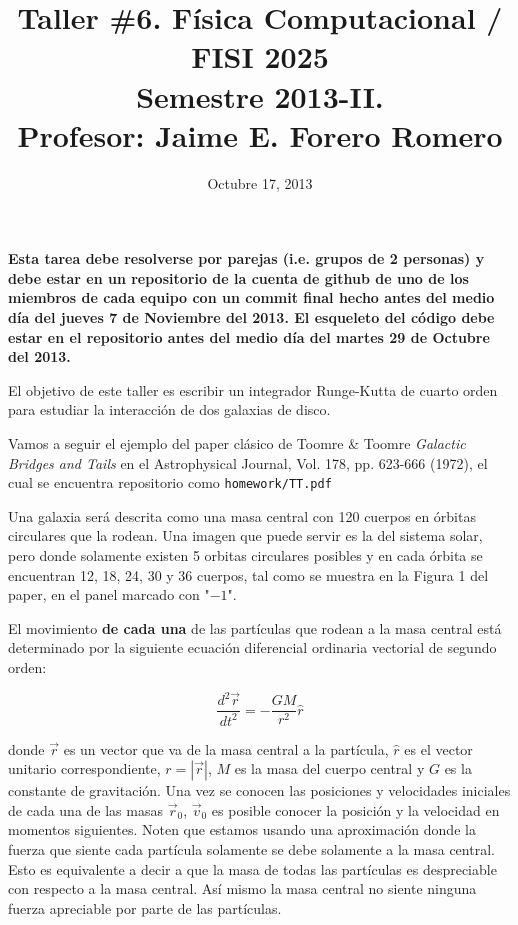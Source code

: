\documentclass{article}
\title{Taller \#6. F\'isica Computacional / FISI 2025 \\Semestre
  2013-II. \\ Profesor: Jaime E. Forero Romero}
\date{Octubre 17, 2013}
\begin{document}
\maketitle

{\bf Esta tarea debe resolverse por parejas (i.e. grupos de 2
  personas) y debe estar en un repositorio de la cuenta de github de
  uno de los miembros de cada equipo con un commit final hecho antes del
  medio d\'ia del jueves 7 de Noviembre del 2013. El esqueleto del
  c\'odigo debe estar en el repositorio antes del medio d\'ia del
  martes 29 de Octubre del 2013.}   


El objetivo de este taller es escribir un integrador Runge-Kutta de
cuarto orden para estudiar la interacci\'on de dos galaxias de
disco. 

Vamos a seguir el ejemplo  del paper cl\'asico de Toomre \& Toomre
\textit{Galactic Bridges and Tails} en el Astrophysical Journal, Vol. 178,
pp. 623-666 (1972), el cual se encuentra repositorio como
\verb"homework/TT.pdf" 

Una galaxia ser\'a descrita como una masa central con 120
cuerpos en \'orbitas circulares que la rodean. Una imagen que puede
servir es la del sistema solar, pero donde solamente existen 5 orbitas
circulares posibles y en cada \'orbita se encuentran 12, 18, 24, 30 y 36
cuerpos, tal como se muestra en la Figura 1 del paper, en el panel
marcado con "$-1$". 

El movimiento {\bf de cada una} de las part\'iculas que rodean a la masa
central est\'a determinado por la siguiente ecuaci\'on diferencial
ordinaria vectorial de segundo orden: 
 
\begin{equation}
\frac{d^2\vec{r}}{dt^2} = -\frac{GM}{r^2} \hat{r}
\end{equation}

donde $\vec{r}$  es un vector que va de la masa central a la
part\'icula, $\hat{r}$ es el vector unitario correspondiente,
$r=|\vec{r}|$, $M$ es la masa del cuerpo central y $G$ es la constante
de gravitaci\'on.  Una vez se conocen las posiciones y velocidades
iniciales de cada una de las masas $\vec{r}_0$, $\vec{v}_0$ es posible
conocer la posici\'on y la velocidad en momentos siguientes. Noten que
estamos usando una  aproximaci\'on donde la fuerza que siente cada
part\'icula solamente se debe solamente a la masa central. Esto es
equivalente a decir a  que la masa de todas las part\'iculas es
despreciable con respecto a la masa central. As\'i mismo la masa central no siente ninguna  fuerza apreciable por parte de las part\'iculas.
\end{document}
